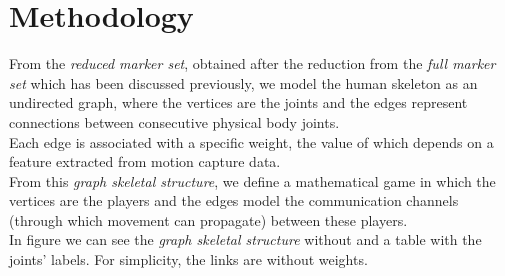 \chapter{Methodology}
\label{chapter:methodology}
From the \textit{reduced marker set}, obtained after the reduction from the \textit{full marker set} which has been discussed previously, we model the human skeleton as an undirected graph, where the vertices are the joints and the edges represent connections between consecutive physical body joints.\\
Each edge is associated with a specific weight, the value of which depends on a feature extracted from motion capture data. \\
From this \textit{graph skeletal structure}, we define a mathematical game in which the vertices are the players and the edges model the communication channels (through which movement can propagate) between these players. \\
In figure we can see the \textit{graph skeletal structure} without and a table with the joints' labels.
For simplicity, the links are without weights.

